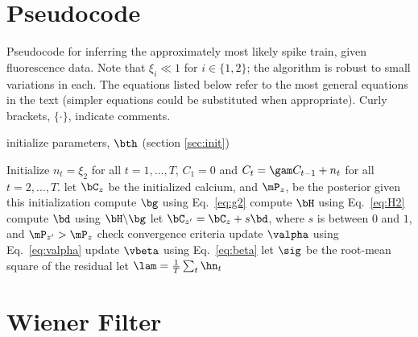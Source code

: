 \newpage
\section{Pseudocode} \label{sec:pseudo}

\begin{algorithm}[h!]
\caption{Pseudocode for inferring the approximately most likely spike train, given fluorescence data. Note that $\xi_i \ll 1$ for $i \in \{1,2\}$; the algorithm is robust to small variations in each. The equations listed below refer to the most general equations in the text (simpler equations could be substituted when appropriate).  Curly brackets, $\{ \cdot \}$, indicate comments.}
\label{eqn:pseudocode}
\begin{algorithmic}[1]
\STATE initialize parameters, $\bth$ (section \ref{sec:init})
	
    \STATE Initialize $n_t=\xi_2$ for all $t=1,\ldots, T$, $C_1=0$ and $C_t = \gam C_{t-1} + n_t$ for all $t=2,\ldots, T$.
	\STATE let $\bC_{z}$ be the initialized calcium, and $\mP_{z}$, be the posterior given this initialization
		\STATE compute $\bg$ using Eq.~\eqref{eq:g2}
		\STATE compute $\bH$ using Eq.~\eqref{eq:H2}
		\STATE compute $\bd$ using $\bH \backslash \bg$ 
		\STATE let $\bC_{z'}=\bC_z + s \bd$, where $s$ is between $0$ and $1$, and $\mP_{z'}>\mP_z$ 
	\ENDWHILE
  \ENDFOR
\STATE check convergence criteria
\STATE update $\valpha$ using Eq.~\eqref{eq:valpha}   
\STATE update $\vbeta$ using Eq.~\eqref{eq:beta}
\STATE let $\sig$ be the root-mean square of the residual
\STATE let $\lam=\frac{1}{T}\sum_t \hn_t$
\ENDWHILE
\end{algorithmic}
\end{algorithm}

\clearpage
\section{Wiener Filter} \label{sec:wiener}

